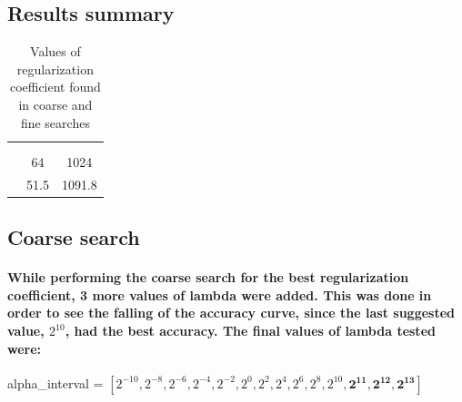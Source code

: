 \documentclass[a4paper]{article}    %
\begin{document}
\subsection{Results summary}

\begin{table}[H]
    \begin{center}
        \begin{tabular}{r|c|c|} 
            \cline{2-3}
            & \multicolumn{2}{|c|}{\cellcolor[gray]{0.8}{$\lambda$ optimum}} \\
            \cline{2-3}
            & \cellcolor[gray]{0.8}{MSE} & \cellcolor[gray]{0.8}{Accuracy} \\
            \cline{1-3}
            \multicolumn{1}{|r|}{\cellcolor[gray]{0.8}{coarse search}} & 64   & 1024   \\
            \cline{1-3}
            \multicolumn{1}{|r|}{\cellcolor[gray]{0.8}{fine search}}   & 51.5 & 1091.8 \\
            \cline{1-3}
        \end{tabular}
    \end{center}
    \caption{Values of regularization coefficient found in coarse and fine searches}
    \label{tab:alpha_results}
\end{table}

\subsection{Coarse search}

\paragraph{While performing the coarse search for the best regularization coefficient, 3 more values of lambda were added. This was done in order to see the falling of the accuracy curve, since the last suggested value, $2^{10}$, had the best accuracy. The final values of lambda tested were:}

\begin{center}
    alpha\_interval = $[2^{-10}, 2^{-8}, 2^{-6}, 2^{-4}, 2^{-2}, 2^{0}, 2^{2}, 2^{4}, 2^{6}, 2^{8}, 2^{10}, \boldsymbol{2^{11}, 2^{12}, 2^{13}}]$
\end{center}
\end{document}
